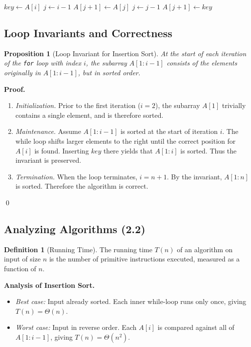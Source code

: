 \documentclass[12pt]{article}
\newtheorem{proposition}[theorem]{Proposition}
\theoremstyle{definition}
\newtheorem{definition}{Definition}
\begin{document}
\begin{algorithm}[H]
\caption{Insertion-Sort($A, n$)}
\begin{algorithmic}[1]
  \State $key \gets A[i]$
  \State $j \gets i - 1$
    \State $A[j+1] \gets A[j]$
    \State $j \gets j - 1$
  \EndWhile
  \State $A[j+1] \gets key$
\EndFor
\end{algorithmic}
\end{algorithm}

\subsection*{Loop Invariants and Correctness}
\begin{proposition}[Loop Invariant for Insertion Sort]
At the start of each iteration of the \texttt{for} loop with index $i$, the subarray 
$A[1:i-1]$ consists of the elements originally in $A[1:i-1]$, but in sorted order.
\end{proposition}

\textbf{Proof.}
\begin{enumerate}
    \item \emph{Initialization.} Prior to the first iteration ($i=2$), the subarray $A[1]$ 
    trivially contains a single element, and is therefore sorted.
    \item \emph{Maintenance.} Assume $A[1:i-1]$ is sorted at the start of iteration $i$. 
    The while loop shifts larger elements to the right until the correct position 
    for $A[i]$ is found. Inserting $key$ there yields that $A[1:i]$ is sorted. 
    Thus the invariant is preserved.
    \item \emph{Termination.} When the loop terminates, $i=n+1$. By the invariant, 
    $A[1:n]$ is sorted. Therefore the algorithm is correct.
\end{enumerate}
\qed

\subsection*{Analyzing Algorithms (2.2)}

\begin{definition}[Running Time]
The running time $T(n)$ of an algorithm on input of size $n$ is the number 
of primitive instructions executed, measured as a function of $n$.
\end{definition}

\textbf{Analysis of Insertion Sort.}
\begin{itemize}
    \item \emph{Best case:} Input already sorted. Each inner while-loop runs only once, 
    giving $T(n) = \Theta(n)$.
    \item \emph{Worst case:} Input in reverse order. Each $A[i]$ is compared against 
    all of $A[1:i-1]$, giving $T(n) = \Theta(n^2)$.
\end{itemize}
\end{document}
